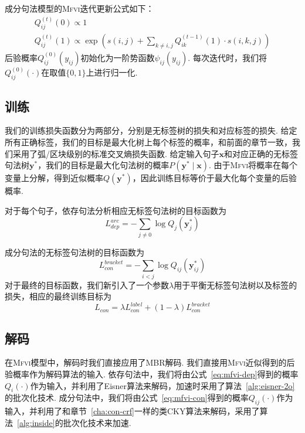 成分句法模型的\textsc{Mfvi}迭代更新公式如下：
\begin{equation}
  \label{eq:mfvi-con}
  \begin{array}{l}
    Q_{ij}^{(t)}(0)\propto 1 \\
    Q_{ij}^{(t)}(1)\propto \exp\left(s(i,j) +\sum_{k\neq i,j} Q_{ik}^{(t-1)}(1)\cdot s(i,k,j) \right)
  \end{array}
\end{equation}
后验概率$Q_{ij}^{(0)}(y_{ij})$初始化为一阶势函数$\psi_{ij}(y_{ij})$.
每次迭代时，我们将$Q_{ij}^{(0)}(\cdot)$在取值$\{0,1\}$上进行归一化.


\subsection{训练}

我们的训练损失函数分为两部分，分别是无标签树的损失和对应标签的损失.
给定所有正确标签，我们的目标是最大化树上每个标签的概率，和前面的章节一致，我们采用了弧/区块级别的标准交叉熵损失函数.
给定输入句子$\boldsymbol{x}$和对应正确的无标签句法树$\boldsymbol{y}^{\ast}$，我们的目标是最大化句法树的概率$P(\boldsymbol{y}^{\ast}\mid\boldsymbol{x})$.
由于\textsc{Mfvi}将概率在每个变量上分解，得到近似概率$Q(\boldsymbol{y}^{\ast})$，因此训练目标等价于最大化每个变量的后验概率.

对于每个句子，依存句法分析相应无标签句法树的目标函数为
\begin{equation}
  \label{eq:dep-vi-arc-loss}
  L_{dep}^{arc}=-\sum_{j\neq 0}\log Q_j(\boldsymbol{y}^{\ast}_j)
\end{equation}

成分句法的无标签句法树的目标函数为
\begin{equation}
  \label{eq:con-vi-bracket-loss}
  L_{con}^{bracket}=-\sum_{i<j}\log Q_{ij}(\boldsymbol{y}^{\ast}_{ij})
\end{equation}
对于最终的目标函数，我们新引入了一个参数$\lambda$用于平衡无标签句法树以及标签的损失，相应的最终训练目标为
\begin{equation}
  \label{eq:con-vi-loss}
  L_{con}=\lambda L_{con}^{label}+(1-\lambda)L_{con}^{bracket}
\end{equation}

\subsection{解码}
在\textsc{Mfvi}模型中，解码时我们直接应用了MBR解码.
我们直接用\textsc{Mfvi}近似得到的后验概率作为解码算法的输入.
依存句法中，我们将由公式~\ref{eq:mfvi-dep}得到的概率$Q_i(\cdot)$作为输入，并利用了Eisner算法来解码，加速时采用了算法~\ref{alg:eisner-2o}的批次化技术.
成分句法中，我们将由公式~\ref{eq:mfvi-con}得到的概率$Q_{ij}(\cdot)$作为输入，并利用了和章节~\ref{cha:con-crf}一样的类CKY算法来解码，采用了算法~\ref{alg:inside}的批次化技术来加速.


